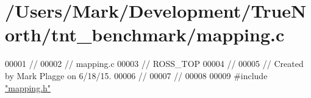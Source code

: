 \hypertarget{mapping_8c_source}{}\section{/\+Users/\+Mark/\+Development/\+True\+North/tnt\+\_\+benchmark/mapping.c}

\begin{DoxyCode}
00001 \textcolor{comment}{//}
00002 \textcolor{comment}{//  mapping.c}
00003 \textcolor{comment}{//  ROSS\_TOP}
00004 \textcolor{comment}{//}
00005 \textcolor{comment}{//  Created by Mark Plagge on 6/18/15.}
00006 \textcolor{comment}{//}
00007 \textcolor{comment}{//}
00008 
00009 \textcolor{preprocessor}{#}\textcolor{preprocessor}{include} \hyperlink{mapping_8h}{"mapping.h"}
\end{DoxyCode}
